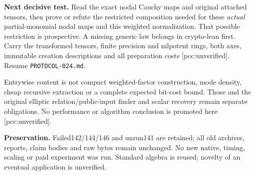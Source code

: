 \documentclass[10pt]{article}
\begin{document}
\textbf{Next decisive test.} Read the exact nodal Cauchy maps and original
attached tensors, then prove or refute the restricted composition needed
for these \emph{actual} partial-monomial nodal maps and this weighted
normalization. That possible restriction is prospective. A missing generic
law belongs in crypto-lean first. Carry the transformed tensors, finite
precision and nilpotent rings, both axes, immutable creation descriptions
and all preparation costs [pcc:unverified]. Resume \texttt{PROTOCOL-024.md}.

Entrywise content is not compact weighted-factor construction, mode
density, cheap recursive extraction or a complete expected bit-cost bound.
Those and the original elliptic relation/public-input finder and scalar
recovery remain separate obligations. No performance or algorithm conclusion
is promoted here [pcc:unverified].

\textbf{Preservation.} Failed142/144/146 and unrun141 are retained; all old
archives, reports, claim bodies and raw bytes remain unchanged. No new
native, timing, scaling or paid experiment was run. Standard algebra is
reused; novelty of an eventual application is unverified.
\end{document}
